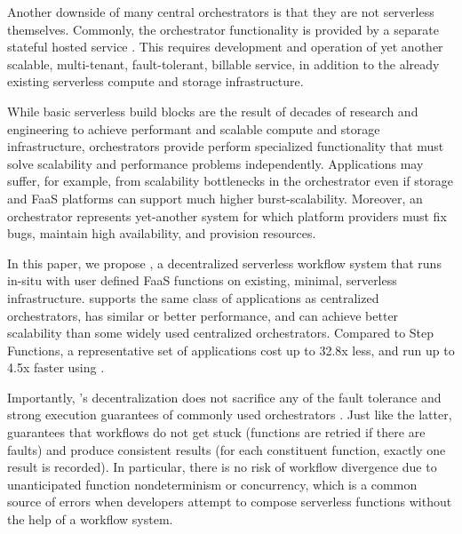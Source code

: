 Another downside of many central orchestrators is that they are not serverless themselves.
Commonly, the orchestrator functionality is provided by a separate stateful hosted service
\cite{aws-step-functions, google-cloud-composer, google-workflows}. This requires
development and operation of yet another scalable, multi-tenant, fault-tolerant, 
billable service, in addition to the already existing serverless compute and storage 
infrastructure. 

While basic
serverless build blocks are the result of decades of research and engineering to
achieve performant and scalable compute and storage infrastructure,
orchestrators provide perform specialized functionality that must solve
scalability and performance problems independently. Applications may suffer, for
example, from scalability bottlenecks in the orchestrator even if storage and
FaaS platforms can support much higher burst-scalability. Moreover, an
orchestrator represents yet-another system for which platform providers must fix
bugs, maintain high availability, and provision resources.

In this paper, we propose \name{}, a decentralized serverless workflow system
that runs in-situ with user defined FaaS functions on existing, minimal,
serverless infrastructure. \name{} supports the same class of applications as
centralized orchestrators, has similar or better performance, and can achieve
better scalability than some widely used centralized orchestrators. Compared to
Step Functions, a representative set of applications cost up to 32.8x less, and
run up to 4.5x faster using \name{}.

Importantly, \name{}'s decentralization does not sacrifice any of the  
fault tolerance and strong execution guarantees of 
commonly used orchestrators \cite{aws-step-functions, durable-functions,
 google-cloud-composer, google-workflows}. 
Just like the latter, 
\name{} guarantees that workflows do not get stuck (functions are retried if there are faults)
and produce consistent results (for each constituent function, exactly one result is recorded).
In particular, there is no risk of workflow divergence due to unanticipated function
nondeterminism or concurrency, which is a common source of errors
when developers attempt to compose serverless functions without the help
of a workflow system.

